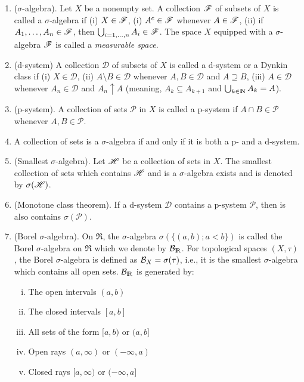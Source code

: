 \documentclass[a4paper,10pt]{article}
\begin{document}
\begin{enumerate}
 \item ($\sigma$-algebra). Let $X$ be a nonempty set. A collection $\mathscr{F}$ of subsets of $X$
       is called a $\sigma$-algebra if (i) $X \in \mathscr{F}$, (i) $A^c\in\mathscr{F}$ whenever $A\in\mathscr{F}$,
       (ii) if $A_1,\ldots, A_n\in\mathscr{F}$, then $\bigcup_{i=1,\ldots,n}A_i\in\mathscr{F}$. The space $X$
       equipped with a $\sigma$-algebra $\mathscr{F}$ is called a \textit{measurable space}.
       
 \item (d-system) A collection $\mathcal{D}$ of subsets of $X$ is called a d-system or a Dynkin class if 
       (i) $X\in\mathcal{D}$,
       (ii) $A\setminus B\in\mathcal{D}$ whenever $A,B\in\mathcal{D}$ and $A\supseteq B$,
       (iii) $A\in\mathcal{D}$ whenever $A_n\in \mathcal{D}$ and $A_n \uparrow A$ (meaning, 
       $A_{k}\subseteq A_{k+1}$ and $\bigcup_{k\in\N}A_k=A$).
       
 \item (p-system). A collection of sets $\mathcal{P}$ in $X$ is called a p-system
       if $A\cap B\in \mathcal{P}$ whenever $A,B\in\mathcal{P}$.
       
 \item A collection of sets is a $\sigma$-algebra if and only if it is both a p- and a d-system.
 
 \item (Smallest $\sigma$-algebra). Let $\mathscr{H}$ be a collection of sets in $X$. The smallest collection of sets
       which contains $\mathscr{H}$ and is a $\sigma$-algebra exists and is denoted by $\sigma(\mathscr{H})$.
 
 \item (Monotone class theorem). If a d-system $\mathcal{D}$ contains a p-system $\mathcal{P}$, then is also contains $\sigma(\mathcal{P})$.
 
 \item \label{mps1311949}
       (Borel $\sigma$-algebra). On $\Re$, the $\sigma$-algebra $\sigma(\{(a,b); a<b\})$ is called the Borel $\sigma$-algebra on $\Re$
       which we denote by $\B_\Re$. For topological spaces $(X,\tau)$, the Borel $\sigma$-algebra is
       defined as $\mathcal{B}_X = \sigma(\tau)$, i.e., it is the smallest $\sigma$-algebra which contains
       all open sets. $\B_\Re$ is generated by:
       \begin{enumerate}[i.]
        \item The open intervals $(a,b)$
        \item The closed intervals $[a,b]$
        \item All sets of the form $[a,b)$ or $(a,b]$
        \item Open rays $(a,\infty)$ or $(-\infty,a)$
        \item Closed rays $[a,\infty)$ or $(-\infty,a]$
       \end{enumerate}            


\end{enumerate}
\end{document}
